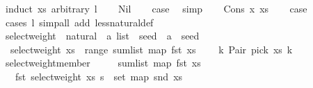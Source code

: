 \begin{isabellebody}
%
\isadelimproof
%
\endisadelimproof
%
\isatagproof
{}\isamarkupfalse%
\ {\isacharparenleft}{\kern0pt}induct\ xs\ arbitrary{\isacharcolon}{\kern0pt}\ l{\isacharparenright}{\kern0pt}\isanewline
\ \ \isamarkupfalse%
\ Nil\ \isamarkupfalse%
\ \isamarkupfalse%
\ {\isacharquery}{\kern0pt}case\ \isamarkupfalse%
\ simp\isanewline
{}\isamarkupfalse%
\isanewline
\ \ \isamarkupfalse%
\ {\isacharparenleft}{\kern0pt}Cons\ x\ xs{\isacharparenright}{\kern0pt}\ \isamarkupfalse%
\ \isamarkupfalse%
\ {\isacharquery}{\kern0pt}case\ \isamarkupfalse%
\ {\isacharparenleft}{\kern0pt}cases\ l{\isacharparenright}{\kern0pt}\ {\isacharparenleft}{\kern0pt}simp{\isacharunderscore}{\kern0pt}all\ add{\isacharcolon}{\kern0pt}\ less{\isacharunderscore}{\kern0pt}natural{\isacharunderscore}{\kern0pt}def{\isacharparenright}{\kern0pt}\isanewline
{}\isamarkupfalse%
%
\endisatagproof
{\isafoldproof}%
%
\isadelimproof
\isanewline
%
\endisadelimproof
\isanewline
{}\isamarkupfalse%
\ select{\isacharunderscore}{\kern0pt}weight\ {\isacharcolon}{\kern0pt}{\isacharcolon}{\kern0pt}\ {\isachardoublequoteopen}{\isacharparenleft}{\kern0pt}natural\ {\isasymtimes}\ {\isacharprime}{\kern0pt}a{\isacharparenright}{\kern0pt}\ list\ {\isasymRightarrow}\ seed\ {\isasymRightarrow}\ {\isacharprime}{\kern0pt}a\ {\isasymtimes}\ seed{\isachardoublequoteclose}\ \isanewline
\ \ {\isachardoublequoteopen}select{\isacharunderscore}{\kern0pt}weight\ xs\ {\isacharequal}{\kern0pt}\ range\ {\isacharparenleft}{\kern0pt}sum{\isacharunderscore}{\kern0pt}list\ {\isacharparenleft}{\kern0pt}map\ fst\ xs{\isacharparenright}{\kern0pt}{\isacharparenright}{\kern0pt}\isanewline
\ \ \ {\isasymcirc}{\isasymrightarrow}\ {\isacharparenleft}{\kern0pt}{\isasymlambda}k{\isachardot}{\kern0pt}\ Pair\ {\isacharparenleft}{\kern0pt}pick\ xs\ k{\isacharparenright}{\kern0pt}{\isacharparenright}{\kern0pt}{\isachardoublequoteclose}\isanewline
\isanewline
{}\isamarkupfalse%
\ select{\isacharunderscore}{\kern0pt}weight{\isacharunderscore}{\kern0pt}member{\isacharcolon}{\kern0pt}\isanewline
\ \ \ {\isachardoublequoteopen}{}\ {\isacharless}{\kern0pt}\ sum{\isacharunderscore}{\kern0pt}list\ {\isacharparenleft}{\kern0pt}map\ fst\ xs{\isacharparenright}{\kern0pt}{\isachardoublequoteclose}\isanewline
\ \ \ {\isachardoublequoteopen}fst\ {\isacharparenleft}{\kern0pt}select{\isacharunderscore}{\kern0pt}weight\ xs\ s{\isacharparenright}{\kern0pt}\ {\isasymin}\ set\ {\isacharparenleft}{\kern0pt}map\ snd\ xs{\isacharparenright}{\kern0pt}{\isachardoublequoteclose}\isanewline

\end{isabellebody}
